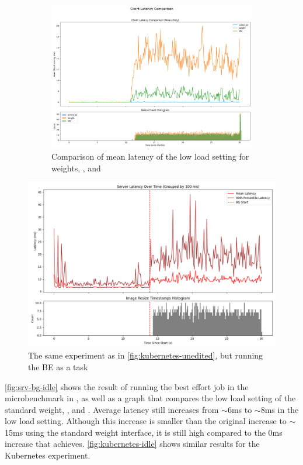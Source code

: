 \begin{figure}[t]
\begin{subfigure}[t]{\columnwidth}
        \includegraphics[width=\columnwidth]{graphs/srv-bg-cmp-all.png}
        \caption{Comparison of mean latency of the low load setting for weights,
        \schedidle{}, and \schedbe{}}\label{fig:srv-bg-cmp}
    \end{subfigure}
    \vspace{4pt}
    \caption{}\label{fig:srv-bg-idle}
\end{figure}

\begin{figure}[t]
    \centering
    \includegraphics[width=\columnwidth]{graphs/kubernetes-idle.png}
    \caption{The same experiment as in \autoref{fig:kubernetes-unedited}, but
    running the BE as a \schedidle{} task}\label{fig:kubernetes-idle}
\end{figure}

\autoref{fig:srv-bg-idle} shows the result of running the best effort job in the
microbenchmark in \schedidle{}, as well as a graph that compares the low load
setting of the standard \cgroups{} weight, \schedbe{}, and \schedidle{}. Average
latency still increases from $\sim$6ms to $\sim$8ms in the low load setting.
Although this increase is smaller than the original increase to $\sim$15ms using
the standard weight interface, it is still high compared to the 0ms increase
that \schedbe{} achieves. \autoref{fig:kubernetes-idle} shows similar results
for the Kubernetes experiment.